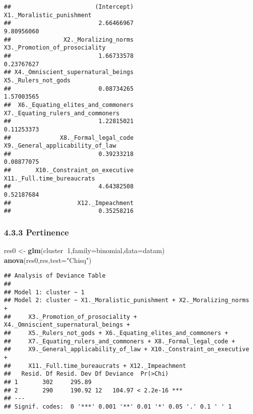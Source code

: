\documentclass[
]{article}
\newenvironment{Shaded}{\begin{snugshade}}{\end{snugshade}}
\newcommand{\DataTypeTok}[1]{\textcolor[rgb]{0.13,0.29,0.53}{#1}}
\newcommand{\DecValTok}[1]{\textcolor[rgb]{0.00,0.00,0.81}{#1}}
\newcommand{\KeywordTok}[1]{\textcolor[rgb]{0.13,0.29,0.53}{\textbf{#1}}}
\newcommand{\NormalTok}[1]{#1}
\newcommand{\OperatorTok}[1]{\textcolor[rgb]{0.81,0.36,0.00}{\textbf{#1}}}
\newcommand{\StringTok}[1]{\textcolor[rgb]{0.31,0.60,0.02}{#1}}
\begin{document}
\begin{verbatim}
##                        (Intercept)          X1._Moralistic_punishment 
##                         2.66466967                         9.80956060 
##               X2._Moralizing_norms      X3._Promotion_of_prosociality 
##                         1.66733578                         0.23767627 
## X4._Omniscient_supernatural_beings                X5._Rulers_not_gods 
##                         0.08734265                         1.57003565 
##  X6._Equating_elites_and_commoners  X7._Equating_rulers_and_commoners 
##                         1.22815021                         0.11253373 
##              X8._Formal_legal_code   X9._General_applicability_of_law 
##                         0.39233218                         0.08877075 
##       X10._Constraint_on_executive         X11._Full.time_bureaucrats 
##                         4.64382508                         0.52187684 
##                   X12._Impeachment 
##                         0.35258216
\end{verbatim}

\hypertarget{pertinence}{%
\subsubsection{4.3.3 Pertinence}\label{pertinence}}

\begin{Shaded}
\begin{Highlighting}[]
\NormalTok{res0 <-}\StringTok{ }\KeywordTok{glm}\NormalTok{(cluster}\OperatorTok{~}\DecValTok{1}\NormalTok{,}\DataTypeTok{family=}\NormalTok{binomial,}\DataTypeTok{data=}\NormalTok{datam)}
\KeywordTok{anova}\NormalTok{(res0,res,}\DataTypeTok{test=}\StringTok{"Chisq"}\NormalTok{)}
\end{Highlighting}
\end{Shaded}

\begin{verbatim}
## Analysis of Deviance Table
## 
## Model 1: cluster ~ 1
## Model 2: cluster ~ X1._Moralistic_punishment + X2._Moralizing_norms + 
##     X3._Promotion_of_prosociality + X4._Omniscient_supernatural_beings + 
##     X5._Rulers_not_gods + X6._Equating_elites_and_commoners + 
##     X7._Equating_rulers_and_commoners + X8._Formal_legal_code + 
##     X9._General_applicability_of_law + X10._Constraint_on_executive + 
##     X11._Full.time_bureaucrats + X12._Impeachment
##   Resid. Df Resid. Dev Df Deviance  Pr(>Chi)    
## 1       302     295.89                          
## 2       290     190.92 12   104.97 < 2.2e-16 ***
## ---
## Signif. codes:  0 '***' 0.001 '**' 0.01 '*' 0.05 '.' 0.1 ' ' 1
\end{verbatim}
\end{document}
